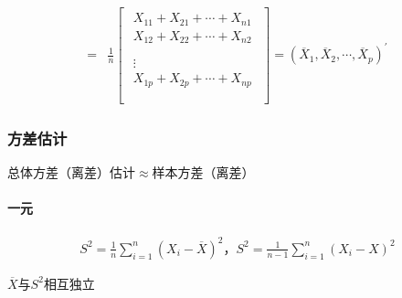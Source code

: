 \documentclass[12pt]{book}
\begin{document}
\begin{align*}
    = & \frac{1}{n} \left[
        \begin{matrix}
            \begin{matrix}
                X_{11}+X_{21}+\cdots+X_{n1} \\
                X_{12}+X_{22}+\cdots+X_{n2} \\
            \end{matrix} \\
            \begin{matrix}
                \vdots                      \\
                X_{1p}+X_{2p}+\cdots+X_{np} \\
            \end{matrix} \\\end{matrix}\right]
    =\left({\overline{X}}_1,{\overline{X}}_2,\cdots,{\overline{X}}_p\right)^\prime
\end{align*}


\subsubsection{方差估计}

总体方差（离差）估计$\approx$样本方差（离差）

\paragraph{一元}

\begin{gather*}
    S^2=\frac{1}{n}\sum_{i=1}^{n}{(X_i-\overline{X})^2}， S^2=\frac{1}{n-1}\sum_{i=1}^{n}{(X_i-X)^2}
\end{gather*}
\par $\overline{X}$与$S^2$相互独立
\end{document}

